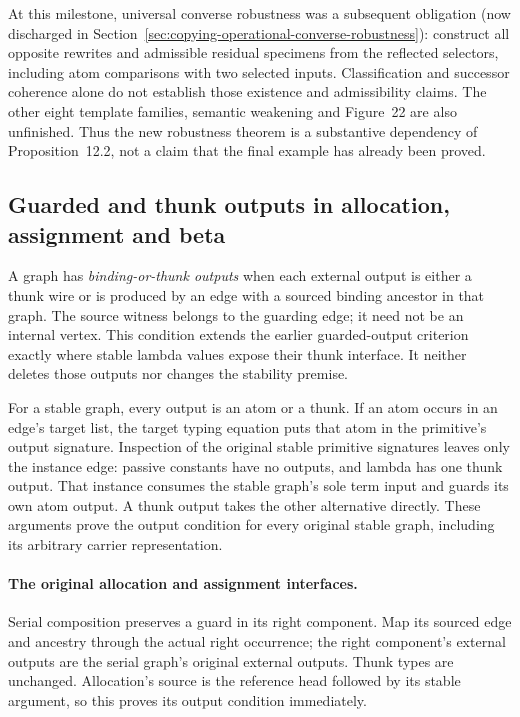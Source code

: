 At this milestone, universal converse robustness was a subsequent obligation
(now discharged in Section~\ref{sec:copying-operational-converse-robustness}):
construct all opposite rewrites and admissible residual specimens from the
reflected selectors, including atom comparisons with two selected inputs.
Classification and successor coherence alone do not establish those
existence and admissibility claims. The other eight template families,
semantic weakening and Figure~22 are also unfinished. Thus the new robustness
theorem is a substantive dependency of Proposition~12.2, not a claim that the
final example has already been proved.

\subsection{Guarded and thunk outputs in allocation, assignment and beta}
A graph has \emph{binding-or-thunk outputs} when each external output is either
a thunk wire or is produced by an edge with a sourced binding ancestor in
that graph. The source witness belongs to the guarding edge; it need not be
an internal vertex. This condition extends the earlier guarded-output
criterion exactly where stable lambda values expose their thunk interface.
It neither deletes those outputs nor changes the stability premise.

For a stable graph, every output is an atom or a thunk. If an atom occurs in
an edge's target list, the target typing equation puts that atom in the
primitive's output signature. Inspection of the original stable primitive
signatures leaves only the instance edge: passive constants have no outputs,
and lambda has one thunk output. That instance consumes the stable graph's
sole term input and guards its own atom output. A thunk output takes the
other alternative directly. These arguments prove the output condition for
every original stable graph, including its arbitrary carrier representation.


\paragraph{The original allocation and assignment interfaces.}
Serial composition preserves a guard in its right component. Map its sourced
edge and ancestry through the actual right occurrence; the right component's
external outputs are the serial graph's original external outputs. Thunk
types are unchanged. Allocation's source is the reference head followed by
its stable argument, so this proves its output condition immediately.


